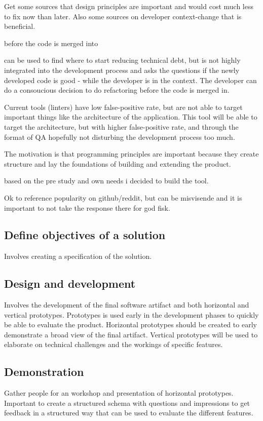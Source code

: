 \documentclass{article}
\begin{document}
Get some sources that design principles are important and would cost much less to fix now than later. Also some sources on developer context-change that is beneficial.


before the code is merged into 


can be used to find where to start reducing technical debt, but is not highly integrated into the development process and asks the questions if the newly developed code is good - while the developer is in the context. The developer can do a consoucious decision to do refactoring before the code is merged in. 

Current tools (linters) have low false-positive rate, but are not able to target important things like the architecture of the application. This tool will be able to target the architecture, but with higher false-positive rate, and through the format of QA hopefully not disturbing the development process too much. 


The motivation is that programming principles are important because they create structure and lay the foundations of building and extending the product.

based on the pre study and own needs i decided to build the tool.

Ok to reference popularity on github/reddit, but can be misvisende and it is important to not take the response there for god fisk.

\subsection{Define objectives of a solution}
Involves creating a specification of the solution.

\subsection{Design and development}
Involves the development of the final software artifact and both horizontal and vertical prototypes. Prototypes is used early in the development phases to quickly be able to evaluate the product. Horizontal prototypes should be created to early demonstrate a broad view of the final artifact. Vertical prototypes will be used to elaborate on technical challenges and the workings of specific features. 
 
\subsection{Demonstration}
Gather people for an workshop and presentation of horizontal prototypes. Important to create a structured schema with questions and impressions to get feedback in a structured way that can be used to evaluate the different features.
 
\end{document}
